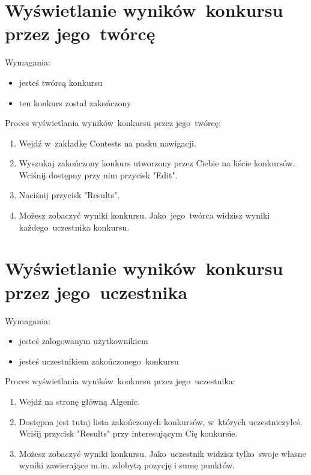 \documentclass{article}
\begin{document}
\section{Wyświetlanie wyników~konkursu przez jego~twórcę}
Wymagania:
\begin{itemize}
	\item jesteś twórcą konkursu
	\item ten konkurs został zakończony
\end{itemize}
Proces wyświetlania wyników~konkursu przez jego~twórcę:
\begin{enumerate}
	\item Wejdź w~zakładkę Contests na pasku nawigacji.
	\item Wyszukaj zakończony konkurs utworzony przez Ciebie na liście konkursów. Wciśnij dostępny przy nim przycisk "Edit".
	\item Naciśnij przycisk "Results".
	\item Możesz zobaczyć wyniki konkursu. Jako~jego~twórca widzisz wyniki każdego~uczestnika konkursu.
\end{enumerate}

\section{Wyświetlanie wyników~konkursu przez jego~uczestnika}
Wymagania:
\begin{itemize}
	\item jesteś zalogowanym użytkownikiem
	\item jesteś uczestnikiem zakończonego~konkursu
\end{itemize}
Proces wyświetlania wyników~konkursu przez jego~uczestnika:
\begin{enumerate}
	\item Wejdź na stronę główną Algenic.
	\item Dostępna jest tutaj lista zakończonych konkursów, w~których uczestniczyłeś. Wciśij przycisk "Results" przy interesującym Cię konkursie.
	\item Możesz zobaczyć wyniki konkursu. Jako~uczestnik widzisz tylko~swoje własne wyniki zawierające m.in. zdobytą pozycję i sumę punktów.
\end{enumerate}
\end{document}
